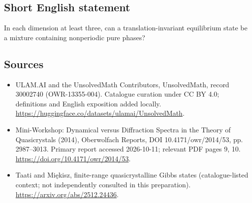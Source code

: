 \documentclass[11pt]{article}
\begin{document}
\subsection{Short English statement}
In each dimension at least three, can a translation-invariant equilibrium state be a mixture containing nonperiodic pure phases?
\subsection{Sources}
\begin{itemize}
\item[\hypertarget{source:30002740:1}{S1}] ULAM.AI and the UnsolvedMath Contributors, UnsolvedMath, record 30002740 (OWR-13355-004). Catalogue curation under CC BY 4.0; definitions and English exposition added locally.
\url{https://huggingface.co/datasets/ulamai/UnsolvedMath}.
\item[\hypertarget{source:30002740:2}{S2}] Mini-Workshop: Dynamical versus Diffraction Spectra in the Theory of Quasicrystals (2014), Oberwolfach Reports, DOI 10.4171/owr/2014/53, pp. 2987--3013. Primary report accessed 2026-10-11; relevant PDF pages 9, 10.
\url{https://doi.org/10.4171/owr/2014/53}.
\item[\hypertarget{source:30002740:3}{S3}] Taati and Miękisz, finite-range quasicrystalline Gibbs states (catalogue-listed context; not independently consulted in this preparation).
\url{https://arxiv.org/abs/2512.24436}.
\end{itemize}
\label{end:30002740}
\end{document}
